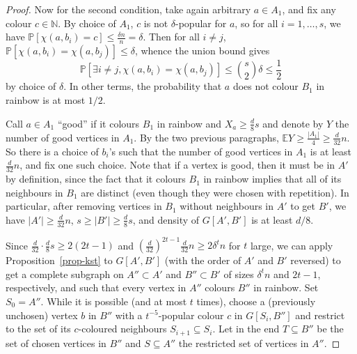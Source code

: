 \documentclass[11pt]{article}
\theoremstyle{plain}
\theoremstyle{definition}
\newcommand{\N}{\mathbb{N}}
\newcommand{\expect}{\mathbb{E}}
\newcommand{\prob}{\mathbb{P}}
\begin{document}
\begin{proof}
    Now for the second condition, take again arbitrary $a\in A_1$, and fix any colour $c\in\N$. By choice of $A_1$, $c$ is not $\delta$-popular for $a$, so for all $i=1,\dots,s$, we have $\prob[\chi(a,b_i)=c]\le\frac{\delta n}{n}=\delta$. Then for all $i\neq j$, $\prob[\chi(a,b_i)=\chi(a,b_j)]\le\delta$, whence the union bound gives
    $$\prob\left[\exists i\neq j,\chi(a,b_i)=\chi(a,b_j)\right]\le \binom{s}{2}\delta\le\frac{1}{2}$$
    by choice of $\delta$. In other terms, the probability that $a$ does not colour $B_1$ in rainbow is at most $1/2$.
    
    Call $a\in A_1$ ``good'' if it colours $B_1$ in rainbow and $X_a\ge\frac{d}{8}s$ and denote by $Y$ the number of good vertices in $A_1$. By the two previous paragraphs, $\expect Y\ge \frac{|A_1|}{4}\ge\frac{d}{32}n$. So there is a choice of $b_i$'s such that the number of good vertices in $A_1$ is at least $\frac{d}{32}n$, and fix one such choice. Note that if a vertex is good, then it must be in $A'$ by definition, since the fact that it colours $B_1$ in rainbow implies that all of its neighbours in $B_1$ are distinct (even though they were chosen with repetition). In particular, after removing vertices in $B_1$ without neighbours in $A'$ to get $B'$, we have $|A'|\ge \frac{d}{32}n$, $s\ge|B'|\ge \frac{d}{8}s$, and density of $G[A',B']$ is at least $d/8$.

    Since $\frac{d}{32}\cdot\frac{d}{8}s\ge 2(2t-1)$ and $\left(\frac{d}{32}\right)^{2t-1} \frac{d}{32}n\ge 2\delta^t n$ for $t$ large, we can apply Proposition~\ref{prop-kst} to $G[A',B']$ (with the order of $A'$ and $B'$ reversed) to get a complete subgraph on $A''\subset A'$ and $B''\subset B'$ of sizes $\delta^t n$ and $2t-1$, respectively, and such that every vertex in $A''$ colours $B''$ in rainbow. Set $S_0=A''$. While it is possible (and at most $t$ times), choose a (previously unchosen) vertex $b$ in $B''$ with a $t^{-5}$-popular colour $c$ in $G[S_i,B'']$ and restrict to the set of its $c$-coloured neighbours $S_{i+1}\subseteq S_i$. Let in the end $T\subseteq B''$ be the set of chosen vertices in $B''$ and $S\subseteq A''$ the restricted set of vertices in $A''$. 
    

\end{proof}
\end{document}
